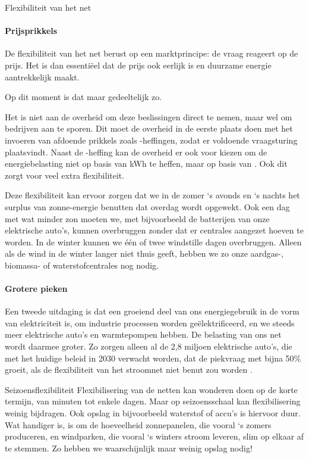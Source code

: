 \begin{voorstel}{Flexibiliteit van het net}
\begin{multicols}{2}
\begin{overwegingen}
\paragraph{Prijsprikkels}
De flexibiliteit van het net berust op een marktprincipe: de vraag reageert op de prijs. Het is dan essentiëel dat de prijs ook eerlijk is en duurzame energie aantrekkelijk maakt.

Op dit moment is dat maar gedeeltelijk zo.

Het is niet aan de overheid om deze beslissingen direct te nemen, maar wel om bedrijven aan te sporen. Dit moet de overheid in de eerste plaats doen met het invoeren van afdoende prikkels zoals \COO-heffingen, zodat er voldoende vraagsturing plaatsvindt. Naast de \COO-heffing kan de overheid er ook voor kiezen om de energiebelasting niet op basis van kWh te heffen, maar op basis van \COO. Ook dit zorgt voor veel extra flexibiliteit.

Deze flexibiliteit kan ervoor zorgen dat we in de zomer ‘s avonds en ‘s nachts het surplus van zonne-energie benutten dat overdag wordt opgewekt. Ook een dag met wat minder zon moeten we, met bijvoorbeeld de batterijen van onze elektrische auto’s, kunnen overbruggen zonder dat er centrales aangezet hoeven te worden. In de winter kunnen we één of twee windstille dagen overbruggen. Alleen als de wind in de winter langer niet thuis geeft, hebben we zo onze aardgas-, biomassa- of waterstofcentrales nog nodig.

\paragraph{Grotere pieken} Een tweede uitdaging is dat een groeiend deel van ons energiegebruik in de vorm van elektriciteit is, om industrie processen worden geëlektrificeerd, en we steeds meer elektrische auto’s en warmtepompen hebben. De belasting van ons net wordt daarmee groter. Zo zorgen alleen al de 2,8 miljoen elektrische auto’s, die met het huidige beleid in 2030 verwacht worden, dat de piekvraag met bijna 50\% groeit, als de flexibiliteit van het stroomnet niet benut zou worden \parencite{enpuls_slim_2019}.


\begin{infobox}{Seizoensflexibiliteit}
Flexibilisering van de netten kan wonderen doen op de korte termijn, van minuten tot enkele dagen. Maar op seizoensschaal kan flexibilisering weinig bijdragen. Ook opslag in bijvoorbeeld waterstof of accu’s is hiervoor duur. Wat handiger is, is om de hoeveelheid zonnepanelen, die vooral ‘s zomers produceren, en windparken, die vooral ‘s winters stroom leveren, slim op elkaar af te stemmen. Zo hebben we waarschijnlijk maar weinig opslag nodig!
\end{infobox}


\end{overwegingen}
\end{multicols}
\end{voorstel}
